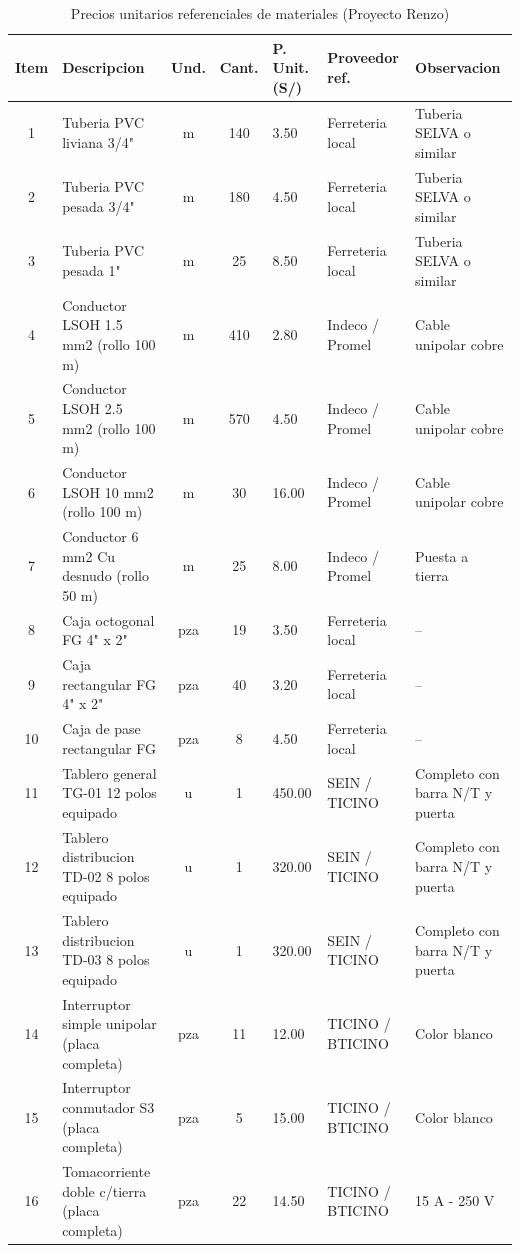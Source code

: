 \begin{table}[H]
\centering
\footnotesize
\caption{Precios unitarios referenciales de materiales (Proyecto Renzo)}
\label{tab:precios-unitarios}
\begin{tabularx}{\textwidth}{c Y c c R{1.8cm} L{2.0cm} L{2.5cm}}
\toprule
\textbf{Item} & \textbf{Descripcion} & \textbf{Und.} & \textbf{Cant.} & \textbf{P. Unit. (S/)} & \textbf{Proveedor ref.} & \textbf{Observacion} \\
 & Tuberia PVC liviana 3/4" & m & 140 & 3.50 & Ferreteria local & Tuberia SELVA o similar \\
2 & Tuberia PVC pesada 3/4" & m & 180 & 4.50 & Ferreteria local & Tuberia SELVA o similar \\
3 & Tuberia PVC pesada 1" & m & 25 & 8.50 & Ferreteria local & Tuberia SELVA o similar \\
4 & Conductor LSOH 1.5 mm2 (rollo 100 m) & m & 410 & 2.80 & Indeco / Promel & Cable unipolar cobre \\
5 & Conductor LSOH 2.5 mm2 (rollo 100 m) & m & 570 & 4.50 & Indeco / Promel & Cable unipolar cobre \\
6 & Conductor LSOH 10 mm2 (rollo 100 m) & m & 30 & 16.00 & Indeco / Promel & Cable unipolar cobre \\
7 & Conductor 6 mm2 Cu desnudo (rollo 50 m) & m & 25 & 8.00 & Indeco / Promel & Puesta a tierra \\
8 & Caja octogonal FG 4" x 2" & pza & 19 & 3.50 & Ferreteria local & -- \\
9 & Caja rectangular FG 4" x 2" & pza & 40 & 3.20 & Ferreteria local & -- \\
10 & Caja de pase rectangular FG & pza & 8 & 4.50 & Ferreteria local & -- \\
11 & Tablero general TG-01 12 polos equipado & u & 1 & 450.00 & SEIN / TICINO & Completo con barra N/T y puerta \\
12 & Tablero distribucion TD-02 8 polos equipado & u & 1 & 320.00 & SEIN / TICINO & Completo con barra N/T y puerta \\
13 & Tablero distribucion TD-03 8 polos equipado & u & 1 & 320.00 & SEIN / TICINO & Completo con barra N/T y puerta \\
14 & Interruptor simple unipolar (placa completa) & pza & 11 & 12.00 & TICINO / BTICINO & Color blanco \\
15 & Interruptor conmutador S3 (placa completa) & pza & 5 & 15.00 & TICINO / BTICINO & Color blanco \\
16 & Tomacorriente doble c/tierra (placa completa) & pza & 22 & 14.50 & TICINO / BTICINO & 15 A - 250 V \\

\end{tabularx}
\end{table}
